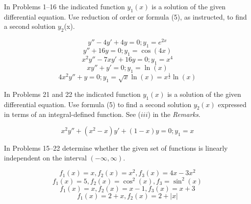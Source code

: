 \documentclass[chapter=4,section=2]{math252homework}
\begin{document}

In Problems 1--16 the indicated function $y_{1}(x)$ is a solution of the given differential equation. Use reduction of order or formula (5), as instructed, to find a second solution $y_{2}$(x).
\begin{problems}
    \problem \[ y'' - 4y' + 4y = 0; y_{1} = e^{2x}\]
	\setcounter{problemsi}{2}
    \problem \[ y'' + 16y = 0; y_{1} = \cos(4x) \]
	\setcounter{problemsi}{8}
    \problem \[ x^{2}y'' - 7xy' + 16y = 0; y_{1}=x^{4} \]
	\setcounter{problemsi}{10}
    \problem \[ xy'' + y' = 0; y_{1}=\ln(x) \]
    \problem \[ 4x^{2}y'' + y = 0; y_{1} = \sqrt{x}\ln(x) = x^{\frac{1}{2}}\ln(x) \]
\end{problems}

In Problems 21 and 22 the indicated function $y_{1}(x)$ is a solution of the given differential equation. Use formula (5) to find a second solution $y_{2}(x)$ expressed in terms of an integral-defined function. See ($iii$) in the \emph{Remarks}.
\begin{problems}[start=21]
    \problem \[ x^{2}y'' + (x^{2} - x)y' + (1 - x)y = 0; y_{1}=x \]
\end{problems}


In Problems 15--22 determine whether the given set of functions is linearly independent on the interval $( -\infty, \infty )$.
\begin{problems}[start=15]
	\problem \[ f_{1}(x) = x, f_{2}(x) = x^{2}, f_{3}(x) = 4x-3x^{2} \]
	\setcounter{problemsi}{16}
	\problem \[ f_{1}(x) = 5, f_{2}(x) = \cos^{2}(x), f_{3} = \sin^{2}(x) \]
	\setcounter{problemsi}{18}
	\problem \[ f_{1}(x) = x, f_{2}(x) = x-1, f_{3}(x) = x + 3 \]
	\problem \[ f_{1}(x) = 2+x, f_{2}(x) = 2+|x| \]
\end{problems}
\end{document}
